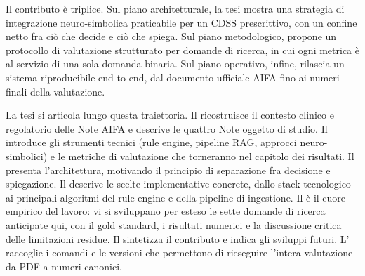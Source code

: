 Il contributo è triplice. Sul piano architetturale, la tesi mostra una strategia di integrazione neuro-simbolica praticabile per un CDSS prescrittivo, con un confine netto fra ciò che decide e ciò che spiega. Sul piano metodologico, propone un protocollo di valutazione strutturato per domande di ricerca, in cui ogni metrica è al servizio di una sola domanda binaria. Sul piano operativo, infine, rilascia un sistema riproducibile end-to-end, dal documento ufficiale AIFA fino ai numeri finali della valutazione.

La tesi si articola lungo questa traiettoria. Il  ricostruisce il contesto clinico e regolatorio delle Note AIFA e descrive le quattro Note oggetto di studio. Il  introduce gli strumenti tecnici (rule engine, pipeline RAG, approcci neuro-simbolici) e le metriche di valutazione che torneranno nel capitolo dei risultati. Il  presenta l'architettura, motivando il principio di separazione fra decisione e spiegazione. Il  descrive le scelte implementative concrete, dallo stack tecnologico ai principali algoritmi del rule engine e della pipeline di ingestione. Il  è il cuore empirico del lavoro: vi si sviluppano per esteso le sette domande di ricerca anticipate qui, con il gold standard, i risultati numerici e la discussione critica delle limitazioni residue. Il  sintetizza il contributo e indica gli sviluppi futuri. L' raccoglie i comandi e le versioni che permettono di rieseguire l'intera valutazione da PDF a numeri canonici.
